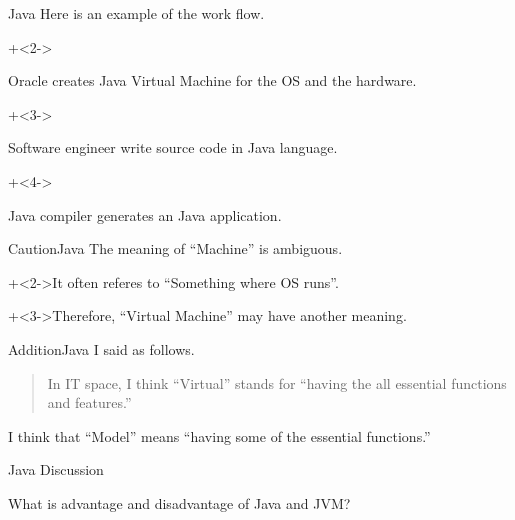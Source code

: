\begin{frame}{Java}{}
    Here is an example of the work flow.
    \vspace{4ex}

    \begin{enumerate}
        \onslide+<2->{\item Oracle creates Java Virtual Machine for the OS and the hardware.}
        \onslide+<3->{\item Software engineer write source code in Java language.}
        \onslide+<4->{\item Java compiler generates an Java application.}
    \end{enumerate}
\end{frame}


\begin{frame}{Caution}{Java}
    The meaning of ``Machine'' is ambiguous.
    \vspace{2ex}

    \onslide+<2->{It often referes to ``Something where OS runs''.}
    \vspace{4ex}

    \onslide+<3->{Therefore, ``Virtual Machine'' may have another meaning.}
\end{frame}


\begin{frame}{Addition}{Java}
    I said as follows.
    \vspace{4ex}

    \begin{quote}In IT space, I think ``Virtual'' stands for
    ``having the all essential functions and features.''\end{quote}
    \vspace{4ex}

    I think that ``Model'' means ``having some of the essential functions.''
\end{frame}


\begin{frame}{Java}{}
    Discussion
    \vspace{4ex}

    What is advantage and disadvantage of Java and JVM?
\end{frame}
